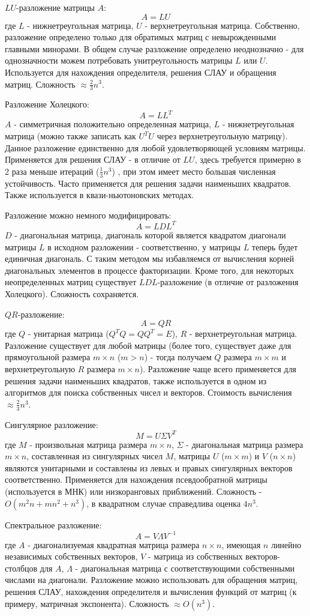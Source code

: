 $LU$-разложение матрицы $A$:
$$ A = LU$$где $L$ - нижнетреугольная матрица, $U$ - верхнетреугольная матрица. Собственно, разложение определено только для обратимых матриц с невырожденными главными минорами. В общем случае разложение определено неоднозначно - для однозначности можем потребовать унитреугольность матрицы $L$ или $U$. Используется для нахождения определителя, решения СЛАУ и обращения матриц. Сложность $\approx \frac{2}{3} n^3$.

Разложение Холецкого:
$$ A = LL^T$$ $A$ - симметричная положительно определенная матрица, $L$ - нижнетреугольная матрица (можно также записать как $U^T U$ через верхнетреугольную матрицу). Данное разложение единственно для любой удовлетворяющей условиям матрицы. Применяется для решения СЛАУ - в отличие от $LU$, здесь требуется примерно в 2 раза меньше итераций ($\frac{1}{3}n^3$) , при этом имеет место большая численная устойчивость. Часто применяется для решения задачи наименьших квадратов. Также используется в квази-ньютоновских методах.

Разложение можно немного модифицировать: $$A = LDL^T$$$D$ - диагональная матрица, диагональ которой является квадратом диагонали матрицы $L$ в исходном разложении - соответственно, у матрицы $L$ теперь будет единичная диагональ. С таким методом мы избавляемся от вычисления корней диагональных элементов в процессе факторизации. Кроме того, для некоторых неопределенных матриц существует $LDL$-разложение (в отличие от разложения Холецкого). Сложность сохраняется.

$QR$-разложение: $$ A = QR$$ где $Q$ - унитарная матрица ($Q^T Q = QQ^T = E$), $R$ - верхнетреугольная матрица. Разложение существует для любой матрицы (более того, существует даже для прямоугольной размера $m \times n$  ($m > n$) - тогда получаем $Q$ размера $m \times m$ и верхнетреугольную $R$ размера $m \times n$). Разложение чаще всего применяется для решения задачи наименьших квадратов, также используется в одном из алгоритмов для поиска собственных чисел и векторов. Стоимость вычисления $\approx \frac{2}{3}n^3$.

Сингулярное разложение:
$$ M = U \Sigma V^T$$ где $M$ - произвольная матрица размера $m \times n$, $\Sigma$ - диагональная матрица размера $m \times n$, составленная из сингулярных чисел $M$, матрицы $U$ ($m \times m$) и $V$ ($n \times n$) являются унитарными и составлены из левых и правых сингулярных векторов соответственно. Применяется для нахождения псевдообратной матрицы (используется в МНК) или низкоранговых приближений. Сложность - $O(m^2n + mn^2 + n^3)$, в квадратном случае справедлива оценка $4n^3$.


Спектральное разложение:
$$A = V \Lambda V^{-1}$$
где $A$ - диагонализуемая квадратная матрица размера $n \times n$, имеющая $n$ линейно независимых собственных векторов, $V$ - матрица из собственных векторов-столбцов для $A$, $\Lambda$ - диагональная матрица с соответствующими собственными числами на диагонали. Разложение можно использовать для обращения матриц, решения СЛАУ, нахождения определителя и вычисления функций от матриц (к примеру, матричная экспонента). Сложность $\approx O(n^3)$. 
